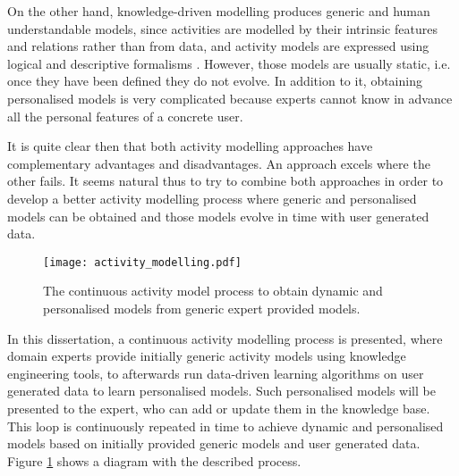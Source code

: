 
On the other hand, knowledge-driven modelling produces generic and human understandable models, since activities are modelled by their intrinsic features and relations rather than from data, and activity models are expressed using logical and descriptive formalisms \cite{Chen2012a}. However, those models are usually static, i.e. once they have been defined they do not evolve. In addition to it, obtaining personalised models is very complicated because experts cannot know in advance all the personal features of a concrete user. 


It is quite clear then that both activity modelling approaches have complementary advantages and disadvantages. An approach excels where the other fails. It seems natural thus to try to combine both approaches in order to develop a better activity modelling process where generic and personalised models can be obtained and those models evolve in time with user generated data. 

\begin{figure}[htbp]
\centering
\texttt{[image: activity\_modelling.pdf]}
    \caption{The continuous activity model process to obtain dynamic and personalised models from generic expert provided models.}
    \label{fig-activity-modelling}
\end{figure}

In this dissertation, a continuous activity modelling process is presented, where domain experts provide initially generic activity models using knowledge engineering tools, to afterwards run data-driven learning algorithms on user generated data to learn personalised models. Such personalised models will be presented to the expert, who can add or update them in the knowledge base. This loop is continuously repeated in time to achieve dynamic and personalised models based on initially provided generic models and user generated data. Figure \ref{fig-activity-modelling} shows a diagram with the described process.

